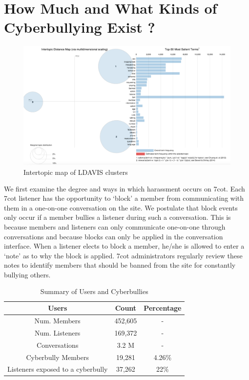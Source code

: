 \section {How Much and What Kinds of Cyberbullying Exist ?}

\begin{figure}
	\centering
	\includegraphics[width=4in5]{LDAVIS.png}
	\caption{Intertopic map of LDAVIS clusters}
	\label{fig:topicmap}
\end{figure}

We first examine the degree and ways in which harassment occurs on 7cot. Each 7cot listener has the opportunity to ‘block’ a member from communicating with them in a one-on-one conversation on the site. We postulate that block events only occur if a member bullies a listener during such a conversation. This is because members and listeners can only communicate one-on-one through conversations and because blocks can only be applied in the conversation interface. When a listener elects to block a member, he/she is allowed to enter a ‘note’ as to why the block is applied. 7cot administrators regularly review these notes to identify members that should be banned from the site for constantly bullying others.

\begin{table}
	\centering
	\begin{tabular}{|c c c|} 
		\hline
		Users & Count & Percentage \\ 
		\hline\hline
		Num. Members & 452,605 & - \\ 
		Num. Listeners & 169,372 & -  \\
		Conversations &   3.2 M & - \\
		Cyberbully Members & 19,281 & 4.26\% \\
		Listeners exposed to a cyberbully & 37,262 & 22\% \\
		\hline
	\end{tabular}
	\caption{Summary of Users and Cyberbullies}
	\label{table:1}
\end{table}

